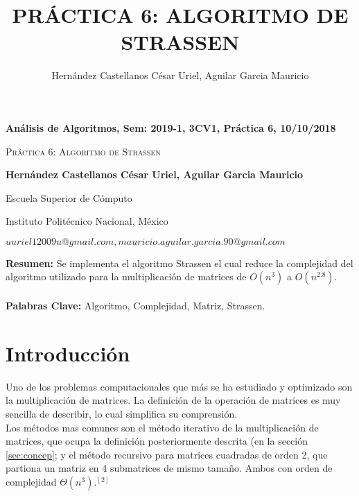 \documentclass[a4paper]{article}
\title{PRÁCTICA 6: ALGORITMO DE STRASSEN  }
\author{{Hern\'andez Castellanos C\'esar Uriel, Aguilar Garcia Mauricio}}
\date{}
\begin{document}
\renewcommand{\refname}{Bibliografía}
\centerline{\bf An\'alisis de Algoritmos, Sem: 2019-1, 3CV1, Pr\'actica 6, 10/10/2018}
\centerline{}
\centerline{}
\begin{center}
\Large{\textsc{Práctica 6: Algoritmo de Strassen}}
\end{center}
\centerline{}
\centerline{\bf {Hern\'andez Castellanos C\'esar Uriel, Aguilar Garcia Mauricio}}
\centerline{}
\centerline{Escuela Superior de C\'omputo}
\centerline{Instituto Polit\'ecnico Nacional, M\'exico}
\centerline{$uuriel12009u@gmail.com, mauricio.aguilar.garcia.90@gmail.com$}
\textbf{Resumen: } Se implementa el algoritmo Strassen el cual reduce la complejidad del algoritmo utilizado para la multiplicación de matrices de $O(n^3)$ a $O(n^{2.8})$.
\\ 
\\
\textbf{Palabras Clave: } Algoritmo, Complejidad, Matriz, Strassen.

\section{Introducción}
\label{sec:introduction}

Uno de los problemas computacionales que más se ha estudiado y optimizado son la multiplicación de matrices. La definición de la operación de matrices es muy sencilla de describir, lo cual simplifica su comprensión.\cite{uno}\\ 
    
    \noindent Los métodos mas comunes son el método iterativo de la multiplicación de matrices, que ocupa la definición posteriormente descrita (en la sección \ref{sec:concep}; y el método recursivo para matrices cuadradas de orden 2, que partiona un matriz en 4 submatrices de mismo tamaño. Ambos con orden de complejidad $\Theta(n^3)$.$^{[2]}$\\
    
\end{document}
